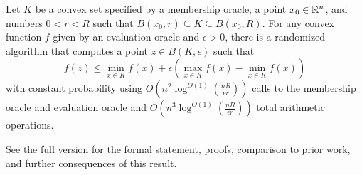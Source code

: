 \begin{thm}
Let $K$ be a convex set specified by a membership oracle, a point
$x_{0}\in\mathbb{R}^{n}$, and numbers $0<r<R$ such that $B(x_{0},r)\subseteq K\subseteq B(x_{0},R)$.
For any convex function $f$ given by an evaluation oracle and
$\epsilon>0$, there is a randomized algorithm that computes a point
$z\in B(K,\epsilon)$ such that 
\[
f(z)\le\min_{x\in K}f(x)+\epsilon\left(\max_{x\in K}f(x)-\min_{x\in K}f(x)\right)
\]
with constant probability using $O(n^{2}\log^{O(1)}(\frac{nR}{\epsilon r}))$
calls to the membership oracle and evaluation oracle and $O(n^{3}\log^{O(1)}(\frac{nR}{\epsilon r}))$
total arithmetic operations. 
\end{thm}

See the full version for the formal statement, proofs, comparison to prior work, and further consequences of this result.

